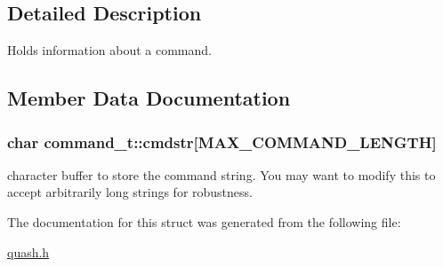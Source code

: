 \subsection{Detailed Description}
Holds information about a command. 

\subsection{Member Data Documentation}
\hypertarget{structcommand__t_a3b77457907f6e606ffafb2f1c2dbfa49}{
\subsubsection[{cmdstr}]{\setlength{\rightskip}{0pt plus 5cm}char command\-\_\-t\-::cmdstr\mbox{[}{\bf M\-A\-X\-\_\-\-C\-O\-M\-M\-A\-N\-D\-\_\-\-L\-E\-N\-G\-T\-H}\mbox{]}}}\label{structcommand__t_a3b77457907f6e606ffafb2f1c2dbfa49}
character buffer to store the command string. You may want to modify this to accept arbitrarily long strings for robustness. 

The documentation for this struct was generated from the following file\-:\begin{DoxyCompactItemize}
\item 
\hyperlink{quash_8h}{quash.\-h}\end{DoxyCompactItemize}
